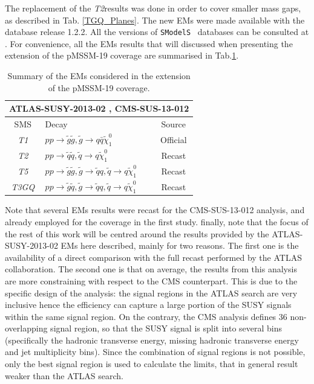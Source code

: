 \documentclass[a4paper,11pt]{article}
\newcommand{\SMO}{\texttt{SModelS\xspace}}
\newcommand{\TGQ}{ \textit{T3GQ}}
\newcommand{\Ttwo}{ \textit{T2}}
\newcommand{\Tfive}{ \textit{T5}}
\begin{document}
The replacement of the \Ttwo results was done in order to cover smaller mass gaps, as described in Tab. \ref{TGQ_Planes}. The new EMs were made available with the database release 1.2.2. All the versions of \SMO~ databases can be consulted at \cite{databases}. For convenience, all the EMs results that will discussed when presenting the extension of the pMSSM-19 coverage are summarised in Tab.\ref{EMS}.


% 
\begin{table}
	\begin{center}
		\renewcommand{\arraystretch}{1.1}
		\begin{tabular}{ c l c}  \toprule  \toprule 
			\multicolumn{3}{c}{ATLAS-SUSY-2013-02 , CMS-SUS-13-012} \\ \toprule 
			SMS & Decay & Source \\ \toprule
			\textit{T1} &  $ p p \rightarrow \tilde g \tilde g, \tilde g \rightarrow q \bar q \tilde \chi_1 ^0 $ & Official \\
			\Ttwo & $  p p \rightarrow \tilde q \tilde q , \tilde q \rightarrow q \tilde \chi_1 ^0 $&  Recast\\
			\Tfive & $p p \rightarrow \tilde g \tilde g , \tilde g \rightarrow \tilde q q,  \tilde q \rightarrow q \tilde \chi_1 ^0 $& Recast  \\
			\TGQ & $ p p \rightarrow \tilde g \tilde q, \tilde g \rightarrow \tilde q q,  \tilde q \rightarrow q \tilde \chi_1 ^0 $ & Recast \\  
			\bottomrule \bottomrule                                             
		\end{tabular}
	\end{center}
	\caption{Summary of the EMs considered in the extension of the pMSSM-19 coverage.}
	\label{EMS}
\end{table}
Note that several EMs results were recast for the CMS-SUS-13-012 analysis, and already employed for the coverage in the first study. finally, note that the focus of the rest of this work will be centred around the results provided by the ATLAS-SUSY-2013-02 EMs here described, mainly for two reasons. The first one is the availability of a direct comparison with the full recast performed by the ATLAS collaboration. The second one is that on average, the results from this analysis are more constraining with respect to the CMS counterpart. This is due to the specific design of the analysis: the signal regions in the ATLAS search are very inclusive hence the efficiency can capture a large portion of the SUSY signals within the same signal region. On the contrary, the CMS analysis defines 36 non-overlapping signal region, so that the SUSY signal is split into several bins (specifically the hadronic transverse energy, missing hadronic transverse energy and jet multiplicity bins). Since the combination of signal regions is not possible, only the best signal region is used to calculate the limits, that in general result weaker than the ATLAS search.
%
\end{document}
